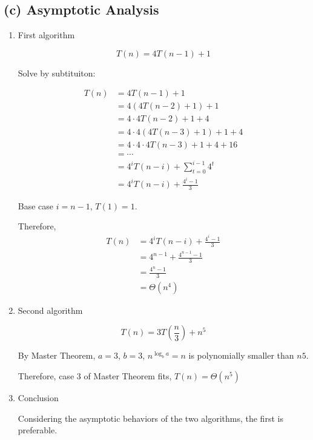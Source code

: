 \documentclass[10pt]{article}
\begin{document}
\subsection*{(c) Asymptotic Analysis}

\begin{enumerate}

  \item{First algorithm

        \[T(n) = 4T(n-1) + 1\]

        Solve by subtituiton:

        \begin{align*}T(n) & =  4T(n-1) + 1                         \\
                   & = 4(4T(n-2)+1) + 1                     \\
                   & = 4 \cdot 4T(n-2) + 1 + 4              \\
                   & = 4 \cdot 4(4T(n-3)+1) + 1 + 4         \\
                   & = 4 \cdot 4 \cdot 4T(n-3) + 1 + 4 + 16 \\
                   & = \cdots                               \\
                   & = 4^iT(n-i) + \sum_{t=0}^{i-1}4^t      \\
                   & = 4^iT(n-i) + \frac{4^i-1}{3}
        \end{align*}

        Base case $i=n-1$, $T(1)=1$.

        Therefore,
        \begin{align*}T(n) & =  4^iT(n-i) + \frac{4^i-1}{3}  \\
                   & = 4^{n-1} + \frac{4^{n-1}-1}{3} \\
                   & = \frac{4^{n}-1}{3}             \\
                   & = \Theta(n^4)
        \end{align*}
        }

  \item{Second algorithm

        \[T(n) = 3T(\frac{n}{3}) + n^5\]

        By Master Theorem, $a=3$, $b=3$, $n^{\log _b a}=n$ is polynomially smaller than $n5$.

        Therefore, case 3 of Master Theorem fits, $T(n) = \Theta(n^5)$
        }

  \item {Conclusion

        Considering the asymptotic behaviors of the two algorithms, the first is preferable.
        }
\end{enumerate}
\end{document}

